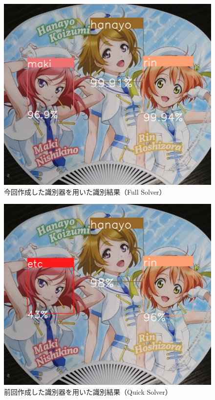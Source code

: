 \documentclass[a4paper,10pt]{jsarticle}
\begin{document}
\begin{figure}[tb]
 \begin{center}
  \includegraphics[clip,width=12cm, bb = 0 0 996 870]{./fig/jpg/lovelive-full-result.jpg}
 \end{center}
 \caption{今回作成した識別器を用いた識別結果（Full Solver）}
 \label{182834_26Jul15}
\end{figure}
\begin{figure}[tb]
 \begin{center}
  \includegraphics[clip,width=12cm, bb = 0 0 996 870]{./fig/jpg/lovelive-quick-result.jpg}
 \end{center}
 \caption{前回作成した識別器を用いた識別結果（Quick Solver）}
 \label{182844_26Jul15}
\end{figure}
\end{document}
